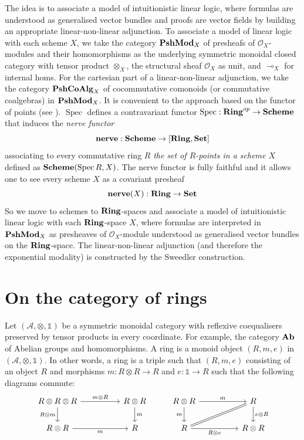 \documentclass[8pt]{article}
\theoremstyle{definition}
\theoremstyle{definition}
\theoremstyle{definition}
\theoremstyle{definition}
\theoremstyle{definition}
\theoremstyle{definition}
\theoremstyle{definition}
\theoremstyle{definition}
\theoremstyle{definition}
\theoremstyle{definition}
\theoremstyle{definition}
\theoremstyle{definition}
\theoremstyle{definition}
\theoremstyle{definition}
\theoremstyle{question}
\begin{document}
The idea is to associate a model of intuitionistic linear logic, where formulas are understood as generalised vector bundles and proofs are vector fields
by building an appropriate linear-non-linear adjunction. To associate a model of linear logic with each scheme $X$, we take the category
${\bf PshMod}_X$ of presheafs of $\mathcal{O}_X$-modules and their homomorphisms as the underlying symmetric monoidal closed category with tensor product $\otimes_X$,
the structural sheaf $\mathcal{O}_X$ as unit, and $\multimap_X$ for internal homs. For the cartesian part 
of a linear-non-linear adjunction, we take the category ${\bf PshCoAlg}_X$ of cocommutative comonoids (or commutative coalgebras) in ${\bf PshMod}_X$.
It is convenient to the approach based on the functor of points (see \cite[I.4]{eisenbud2000geometry}). $\operatorname{Spec}$
defines a contravariant functor $\operatorname{Spec} : {\bf Ring}^{op} \to {\bf Scheme}$ that induces the \emph{nerve functor}
\[
{\bf nerve} : {\bf Scheme} \to [{\bf Ring},{\bf Set}]
\]
associating to every commutative ring $R$ \emph{the set of $R$-points in a scheme $X$} defined as ${\bf Scheme}(\operatorname{Spec}R, X)$.
The nerve functor is fully faithful and it allows one to see every scheme $X$ as a covariant presheaf
\[
{\bf nerve}(X) : {\bf Ring} \to {\bf Set}
\]
So we move to schemes to ${\bf Ring}$-spaces and associate a model of intuitionistic linear logic with each ${\bf Ring}$-space $X$, 
where formulas are interpreted in ${\bf PshMod}_X$ as presheaves of $\mathcal{O}_X$-module understood as generalised vector bundles
on the ${\bf Ring}$-space. The linear-non-linear adjunction (and therefore the exponential modality) is constructed by the Sweedler construction.

\section{On the category of rings}

Let $(\mathcal{A}, \otimes, \mathds{1})$ be a symmetric monoidal category with reflexive coequalisers preserved by tensor products in every coordinate.
For example, the category ${\bf Ab}$ of Abelian groups and homomorphisms. A ring is a monoid object $(R, m, e)$ in $(\mathcal{A}, \otimes, \mathds{1})$.
In other words, a ring is a triple such that $(R, m, e)$ consisting of an object $R$ and morphisms $m : R \otimes R \to R$ and $e : \mathds{1} \to R$
such that the following diagrams commute:
\[
\begin{tikzcd}
  R \otimes R \otimes R \ar[d, "R \otimes m"'] \ar[rr, "m \otimes R"] && R \otimes R \ar[d, "m"]  & R \otimes R \ar[d, "m"'] \ar[rr, "m"] && R \ar[d, "e \otimes R"] \\
  R \otimes R \ar[rr, "m"'] && R                                                                  & R \ar[urr, equal] \ar[rr, "R \otimes e"'] && R \otimes R
\end{tikzcd}
\]
\end{document}
